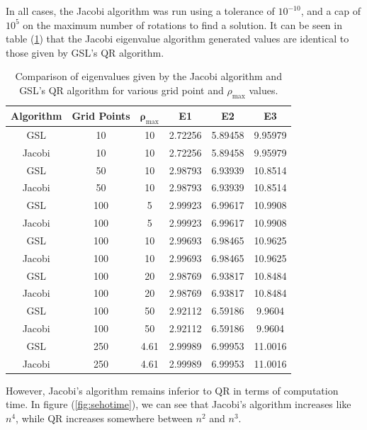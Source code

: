 \documentclass[a4paper,12pt]{report}
\begin{document}
In all cases, the Jacobi algorithm was run using a tolerance of $10^{-10}$, and a cap of $10^5$ on the maximum number of rotations to find a solution. It can be seen in table (\ref{tbl:comp}) that the Jacobi eigenvalue algorithm generated values are identical to those given by GSL's QR algorithm. 
\begin{table}[h]
 \centering
\begin{center}
\begin{tabular}{|c|c|c|c|c|c|}\hline
\textbf{Algorithm} & \textbf{Grid Points} & $\mathbf{\rho_{\mathrm{max}}}$ & \textbf{E1} & \textbf{E2} & \textbf{E3}\\\hline
GSL & 10 & 10 & 2.72256 & 5.89458 & 9.95979 \\\hline
Jacobi & 10 & 10 & 2.72256 & 5.89458 & 9.95979 \\\hline
GSL & 50 & 10 & 2.98793 & 6.93939 & 10.8514 \\\hline
Jacobi & 50 & 10 & 2.98793 & 6.93939 & 10.8514 \\\hline
GSL & 100 & 5 & 2.99923 & 6.99617 & 10.9908 \\\hline
Jacobi & 100 & 5 & 2.99923 & 6.99617 & 10.9908 \\\hline
GSL & 100 & 10 & 2.99693 & 6.98465 & 10.9625 \\\hline
Jacobi & 100 & 10 & 2.99693 & 6.98465 & 10.9625 \\\hline
GSL & 100 & 20 & 2.98769 & 6.93817 & 10.8484 \\\hline
Jacobi & 100 & 20 & 2.98769 & 6.93817 & 10.8484 \\\hline
GSL & 100 & 50 & 2.92112 & 6.59186 & 9.9604 \\\hline
Jacobi & 100 & 50 & 2.92112 & 6.59186 & 9.9604 \\\hline
GSL & 250 & 4.61 & 2.99989 & 6.99953 & 11.0016 \\\hline
Jacobi & 250 & 4.61 & 2.99989 & 6.99953 & 11.0016 \\\hline
\end{tabular}
\end{center}
\caption{Comparison of eigenvalues given by the Jacobi algorithm and GSL's QR algorithm for various grid point and $\rho_{\mathrm{max}}$ values.\label{tbl:comp}}
\end{table}

However, Jacobi's algorithm remains inferior to QR in terms of computation time. In figure (\ref{fig:sehotime}), we can see that Jacobi's algorithm increases like $n^4$, while QR increases somewhere between $n^2$ and $n^3$.
\end{document}
